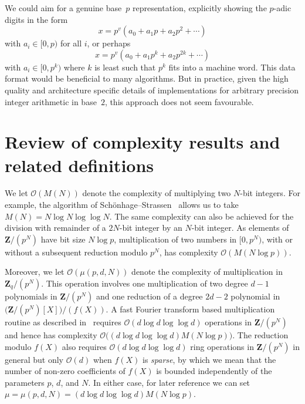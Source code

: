 \begin{rem}
We could aim for a genuine base~$p$ representation, explicitly showing 
the $p$-adic digits in the form 
\begin{equation*}
x = p^v (a_0 + a_1 p + a_2 p^2 + \dotsb) 
\end{equation*}
with $a_i \in [0,p)$ for all $i$, or perhaps 
\begin{equation*}
x = p^v (a_0 + a_1 p^k + a_2 p^{2k} + \dotsb)
\end{equation*}
with $a_i \in [0,p^k)$ where $k$ is least such that $p^{k}$ fits into 
a machine word.
This data format would be beneficial to many algorithms.  But in practice, 
given the high quality and architecture specific details of implementations 
for arbitrary precision integer arithmetic in base~$2$, this approach does 
not seem favourable.
\end{rem}

\section{Review of complexity results and related definitions}

We let $\mathcal{O}(M(N))$ denote the complexity of multiplying two 
$N$-bit integers.  For example, the algorithm of 
Sch\"onhage--Strassen~\citep{SchoenhageStrassen1971}
allows us to take $M(N) = N \log N \log \log N$.  The same 
complexity can also be achieved for the division with remainder of 
a $2N$-bit integer by an $N$-bit integer.
As elements of $\mathbf{Z} / (p^N)$ have bit size $N \log p$, 
multiplication of two numbers in $[0, p^N)$, with or without a subsequent 
reduction modulo $p^N$, has complexity $\mathcal{O}(M(N \log p))$.

Moreover, we let $\mathcal{O}(\mu(p,d,N))$ denote the complexity of 
multiplication in $\mathbf{Z}_q / (p^N)$.  This operation involves one 
multiplication of two degree $d-1$ polynomials in $\mathbf{Z}/(p^N)$ 
and one reduction of a degree $2d - 2$ polynomial in 
$\bigl( \mathbf{Z}/(p^N)[X] \bigr) / (f(X))$.  A fast Fourier transform 
based multiplication routine as described in~\citep[\S 4]{Bernstein2008} 
requires $\mathcal{O}(d \log d \log \log d)$ operations in $\mathbf{Z}/(p^N)$ 
and hence has complexity $\mathcal{O}\bigl((d \log d \log \log d) M(N \log p)\bigr)$.  The reduction 
modulo $f(X)$ also requires $\mathcal{O}(d \log d \log \log d)$ ring 
operations in $\mathbf{Z} / (p^N)$ in general but only $\mathcal{O}(d)$ 
when $f(X)$ is \emph{sparse}, by which we mean that the number of non-zero 
coefficients of $f(X)$ is bounded independently of the parameters 
$p$, $d$, and $N$.  In either case, for later reference we can set 
$\mu = \mu(p,d,N) = (d \log d \log \log d) M(N \log p)$.

